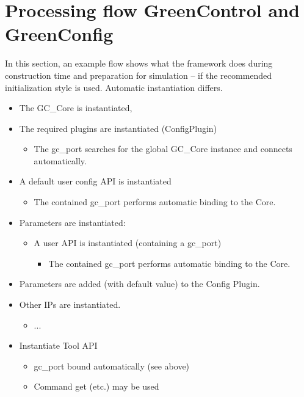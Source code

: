 \section{Processing flow GreenControl and GreenConfig}
In this section, an example flow shows what the framework does during construction time and preparation for simulation -- if the recommended initialization style is used. Automatic instantiation differs.


\begin{itemize}
	\item The GC\_Core is instantiated,

	\item The required plugins are instantiated (ConfigPlugin)
	\begin{itemize}
		\item The gc\_port searches for the global GC\_Core instance and connects automatically.
	\end{itemize}

	\item A default user config API is instantiated
	\begin{itemize}
		\item The contained gc\_port performs automatic binding to the Core.
	\end{itemize}

	\item Parameters are instantiated:
	\begin{itemize}
		\item A user API is instantiated (containing a gc\_port)
		\begin{itemize}
			\item The contained gc\_port performs automatic binding to the Core.
		\end{itemize}
	\end{itemize}
	\item Parameters are added (with default value) to the Config Plugin.

	\item Other IPs are instantiated.
	\begin{itemize}
		\item ...
	\end{itemize}

  \item Instantiate Tool API
  \begin{itemize}
		\item gc\_port bound automatically (see above)
		\item Command get (etc.) may be used
	\end{itemize}


\end{itemize}
